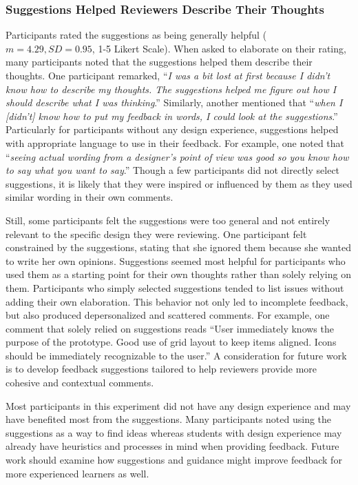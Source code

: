 \subsubsection{Suggestions Helped Reviewers Describe Their Thoughts}
Participants rated the suggestions as being generally helpful ($m = 4.29, SD = 0.95$, 1-5 Likert Scale). When asked to elaborate on their rating, many participants noted that the suggestions helped them describe their thoughts. One participant remarked, ``\textit{I was a bit lost at first because I didn't know how to describe my thoughts. The suggestions helped me figure out how I should describe what I was thinking}.'' Similarly, another mentioned that ``\textit{when I [didn't] know how to put my feedback in words, I could look at the suggestions}.'' Particularly for participants without any design experience, suggestions helped with appropriate language to use in their feedback. For example, one noted that ``\textit{seeing actual wording from a designer's point of view was good so you know how to say what you want to say}.'' Though a few participants did not directly select suggestions, it is likely that they were inspired or influenced by them as they used similar wording in their own comments. 

Still, some participants felt the suggestions were too general and not entirely relevant to the specific design they were reviewing. One participant felt constrained by the suggestions, stating that she ignored them because she wanted to write her own opinions. Suggestions seemed most helpful for participants who used them as a starting point for their own thoughts rather than solely relying on them. Participants who simply selected suggestions tended to list issues without adding their own elaboration. This behavior not only led to incomplete feedback, but also produced depersonalized and scattered comments. For example, one comment that solely relied on suggestions reads ``User immediately knows the purpose of the prototype. Good use of grid layout to keep items aligned. Icons should be immediately recognizable to the user.'' A consideration for future work is to develop feedback suggestions tailored to help reviewers provide more cohesive and contextual comments. 

Most participants in this experiment did not have any design experience and may have benefited most from the suggestions. Many participants noted using the suggestions as a way to find ideas whereas students with design experience may already have heuristics and processes in mind when providing feedback. Future work should examine how suggestions and guidance might improve feedback for more experienced learners as well.

